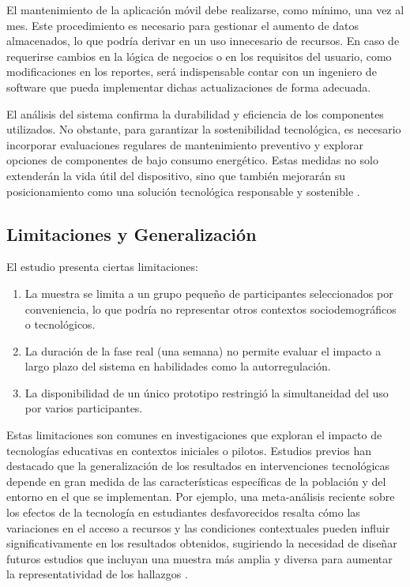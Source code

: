 \documentclass[a4paper,fleqn]{cas-sc}
\begin{document}
				El mantenimiento de la aplicación móvil debe realizarse, como mínimo, una vez al mes. Este procedimiento es necesario para gestionar el aumento de datos almacenados, lo que podría derivar en un uso innecesario de recursos. En caso de requerirse cambios en la lógica de negocios o en los requisitos del usuario, como modificaciones en los reportes, será indispensable contar con un ingeniero de software que pueda implementar dichas actualizaciones de forma adecuada.
				
				El análisis del sistema confirma la durabilidad y eficiencia de los componentes utilizados. No obstante, para garantizar la sostenibilidad tecnológica, es necesario incorporar evaluaciones regulares de mantenimiento preventivo y explorar opciones de componentes de bajo consumo energético. Estas medidas no solo extenderán la vida útil del dispositivo, sino que también mejorarán su posicionamiento como una solución tecnológica responsable y sostenible \citep{Deng2024Does}.
				
		\subsection{Limitaciones y Generalización}
			El estudio presenta ciertas limitaciones:
			
			\begin{enumerate}
				\item La muestra se limita a un grupo pequeño de participantes seleccionados por conveniencia, lo que podría no representar otros contextos sociodemográficos o tecnológicos.
				\item La duración de la fase real (una semana) no permite evaluar el impacto a largo plazo del sistema en habilidades como la autorregulación.
				\item La disponibilidad de un único prototipo restringió la simultaneidad del uso por varios participantes.
			\end{enumerate}
			
			Estas limitaciones son comunes en investigaciones que exploran el impacto de tecnologías educativas en contextos iniciales o pilotos. Estudios previos han destacado que la generalización de los resultados en intervenciones tecnológicas depende en gran medida de las características específicas de la población y del entorno en el que se implementan. Por ejemplo, una meta-análisis reciente sobre los efectos de la tecnología en estudiantes desfavorecidos resalta cómo las variaciones en el acceso a recursos y las condiciones contextuales pueden influir significativamente en los resultados obtenidos, sugiriendo la necesidad de diseñar futuros estudios que incluyan una muestra más amplia y diversa para aumentar la representatividad de los hallazgos \citep{DiPietro2025Meta}.
			
\end{document}
